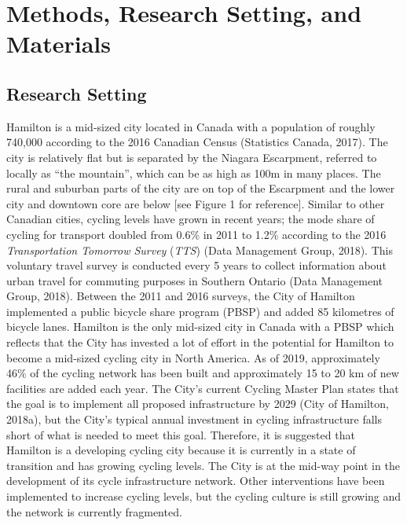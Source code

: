 \documentclass[]{elsarticle} %
\begin{document}
\hypertarget{sec:methods}{%
\section{Methods, Research Setting, and Materials}\label{sec:methods}}

\hypertarget{research-setting}{%
\subsection{Research Setting}\label{research-setting}}

Hamilton is a mid-sized city located in Canada with a population of
roughly 740,000 according to the 2016 Canadian Census (Statistics
Canada, 2017). The city is relatively flat but is separated by the
Niagara Escarpment, referred to locally as ``the mountain'', which can
be as high as 100m in many places. The rural and suburban parts of the
city are on top of the Escarpment and the lower city and downtown core
are below {[}see Figure 1 for reference{]}. Similar to other Canadian
cities, cycling levels have grown in recent years; the mode share of
cycling for transport doubled from 0.6\% in 2011 to 1.2\% according to
the 2016 \emph{Transportation Tomorrow Survey} (\emph{TTS}) (Data
Management Group, 2018). This voluntary travel survey is conducted every
5 years to collect information about urban travel for commuting purposes
in Southern Ontario (Data Management Group, 2018). Between the 2011 and
2016 surveys, the City of Hamilton implemented a public bicycle share
program (PBSP) and added 85 kilometres of bicycle lanes. Hamilton is the
only mid-sized city in Canada with a PBSP which reflects that the City
has invested a lot of effort in the potential for Hamilton to become a
mid-sized cycling city in North America. As of 2019, approximately 46\%
of the cycling network has been built and approximately 15 to 20 km of
new facilities are added each year. The City's current Cycling Master
Plan states that the goal is to implement all proposed infrastructure by
2029 (City of Hamilton, 2018a), but the City's typical annual investment
in cycling infrastructure falls short of what is needed to meet this
goal. Therefore, it is suggested that Hamilton is a developing cycling
city because it is currently in a state of transition and has growing
cycling levels. The City is at the mid-way point in the development of
its cycle infrastructure network. Other interventions have been
implemented to increase cycling levels, but the cycling culture is still
growing and the network is currently fragmented.
\end{document}
